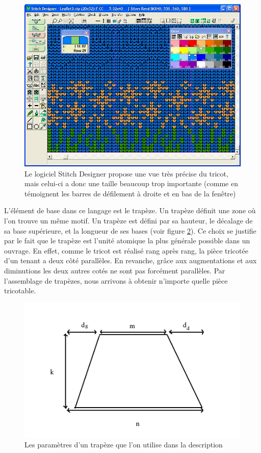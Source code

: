 \documentclass{article}
\begin{document}
\begin{figure}[!ht]
  \centering \includegraphics[scale=0.3]{../img/grid.jpg}
  \caption{Le logiciel Stitch Designer propose une vue très précise du
    tricot, mais celui-ci a donc une taille beaucoup trop importante
    (comme en témoignent les barres de défilement à droite et en bas
    de la fenêtre)}
  \label{logiciel}
\end{figure}

L'élément de base dans ce langage est le trapèze. Un trapèze définit
une zone où l'on trouve un même motif. Un trapèze est défini par sa
hauteur, le décalage de sa base supérieure, et la longueur de ses
bases (voir figure \ref{trapeze}). Ce choix se justifie par le fait
que le trapèze est l'unité atomique la plus générale possible dans un
ouvrage. En effet, comme le tricot est réalisé rang après rang, la pièce
tricotée d'un tenant a deux côté parallèles. En revanche, grâce aux 
augmentations et aux diminutions les deux autres cotés ne sont pas 
forcément parallèles. Par l'assemblage de trapèzes, nous arrivons
à obtenir n'importe quelle pièce tricotable.

\begin{figure}[!ht]
  \centering \includegraphics[scale=0.5]{../img/trapeze.jpg}
  \caption{Les paramètres d'un trapèze que l'on utilise dans la
    description}
  \label{trapeze}
\end{figure}
\end{document}
